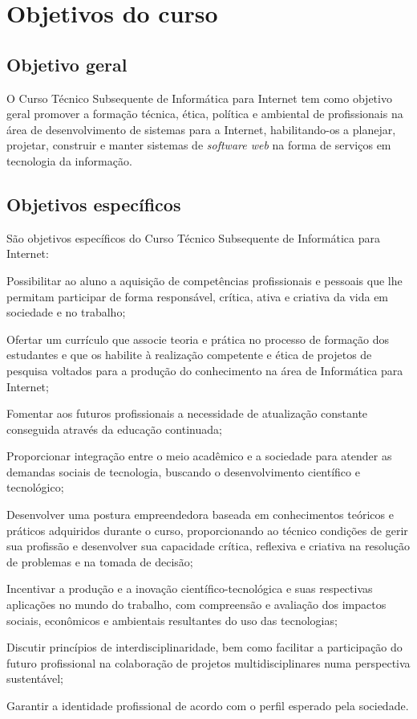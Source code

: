 \documentclass[
	12pt,				%
	openright,			%
	twoside,			%
	a4paper,			%
	chapter=TITLE,		%
	english,			%
	french,				%
	spanish,			%
	brazil,				%
	]{abntex2}
\begin{document}
\chapter{Objetivos do curso}

\section{Objetivo geral}


O Curso Técnico Subsequente de Informática para Internet tem como objetivo geral promover a formação técnica, ética, política e ambiental de profissionais na área de desenvolvimento de sistemas para a Internet, habilitando-os a planejar, projetar, construir e manter sistemas de \textit{software web} na forma de serviços em tecnologia da informação.


\section{Objetivos específicos}

São objetivos específicos do Curso Técnico Subsequente de Informática para Internet:
\begin{alineas}
    \item Possibilitar ao aluno a aquisição de competências profissionais e pessoais que lhe permitam participar de forma responsável, crítica, ativa e criativa da vida em sociedade e no trabalho;
    \item  Ofertar um currículo que associe teoria e prática no processo de formação dos estudantes e que os habilite à realização competente e ética de projetos de pesquisa voltados para a produção do conhecimento na área de Informática para Internet;
    \item  Fomentar aos futuros profissionais a necessidade de atualização constante conseguida através da educação continuada;
    \item  Proporcionar integração entre o meio acadêmico e a sociedade para atender as demandas sociais de tecnologia, buscando o desenvolvimento científico e tecnológico;
    \item  Desenvolver uma postura empreendedora baseada em conhecimentos teóricos e práticos adquiridos durante o curso, proporcionando ao técnico condições de gerir sua profissão e desenvolver sua capacidade crítica, reflexiva e criativa na resolução de problemas e na tomada de decisão;
    \item  Incentivar a produção e a inovação científico-tecnológica e suas respectivas aplicações no mundo do trabalho, com compreensão e avaliação dos impactos sociais, econômicos e ambientais resultantes do uso das tecnologias;
    \item Discutir  princípios de interdisciplinaridade, bem como facilitar a participação do futuro profissional na colaboração de projetos multidisciplinares numa perspectiva sustentável;
    \item Garantir a identidade profissional de acordo com o perfil esperado pela sociedade.
\end{alineas}
\end{document}
